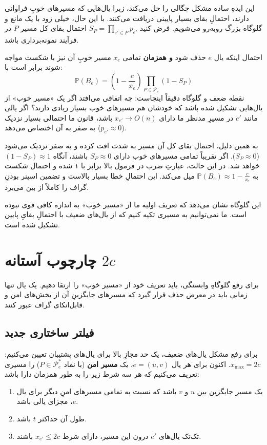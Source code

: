 \documentclass[11pt,a4paper]{report}
\theoremstyle{plain}
\theoremstyle{definition}
\theoremstyle{remark}
\begin{document}
این ایدهِ ساده مشکل چگالی را حل می‌کند، زیرا یال‌هایی که مسیرهای خوبِ فراوانی دارند، احتمالِ بقای بسیار پایینی دریافت می‌کنند. با این حال، خیلی زود با یک مانع و گلوگاه بزرگ روبه‌رو می‌شویم. فرض کنید $S_P = \prod_{e' \in P} p_{e'}$ احتمال بقای کل مسیر $P$ در فرآیند نمونه‌برداری باشد.

احتمال اینکه یال $e$ حذف شود \textbf{و همزمان} تمامی $x_e$ مسیر خوبِ آن نیز با شکست مواجه شوند برابر است با:
\[
\mathbb{P}(B_e) = \left( 1 - \frac{c}{x_e} \right) \prod_{P \in \mathcal{P}_e} (1 - S_P)
\]
نقطه ضعف و گلوگاه دقیقاً اینجاست: چه اتفاقی می‌افتد اگر یک «مسیر خوب» از یال‌هایی تشکیل شده باشد که خودشان هم مسیرهای خوب بسیار زیادی دارند؟ اگر یالی مانند $e'$ در مسیرِ مدنظر ما دارای $x_{e'} \to O(n)$ باشد، قانون ما احتمالی بسیار نزدیک به صفر به آن اختصاص می‌دهد ($p_{e'} \approx 0$).

به همین دلیل، احتمال بقای کل آن مسیر به شدت افت کرده و به صفر نزدیک می‌شود ($S_P \approx 0$). اگر تقریباً تمامی مسیرهای خوب دارای $S_P \approx 0$ باشند، آنگاه $(1 - S_P) \approx 1$ خواهد شد. در این حالت، عبارتِ ضرب در فرمول بالا برابر با ۱ شده و احتمال شکست به $\mathbb{P}(B_e) \approx 1 - \frac{c}{x_e}$ میل می‌کند. این احتمالِ خطا بسیار بالاست و تضمین اسپنر بودنِ گراف را کاملاً از بین می‌برد.

این گلوگاه نشان می‌دهد که تعریف اولیه ما از «مسیر خوب» به اندازه کافی قوی نبوده است. ما نمی‌توانیم به مسیری تکیه کنیم که از یال‌های ضعیف با احتمالِ بقایِ پایین تشکیل شده است.

\chapter{چارچوب آستانه \texorpdfstring{$2c$}{2c}}
برای رفع گلوگاهِ وابستگی، باید تعریف خود از «مسیر خوب» را ارتقا دهیم. یک یال تنها زمانی باید در معرض حذف قرار گیرد که مسیرهای جایگزینِ آن از بخش‌های امن و قابل‌اتکای گراف عبور کنند.

\section{فیلتر ساختاری جدید}
برای رفع مشکل یال‌های ضعیف، یک حد مجازِ بالا برای یال‌های پشتیبان تعیین می‌کنیم: $x_{\max} = 2c$. اکنون برای هر یال $e=(u,v)$، یک \textbf{مسیر امن} (با نماد $P \in \mathcal{P}^*_e$) را مسیری تعریف می‌کنیم که هر سه شرط زیر را به طور همزمان دارا باشد:
\begin{enumerate}
    \item یک مسیر جایگزین بین $u$ و $v$ باشد که نسبت به تمامی مسیرهای امنِ دیگر برای یال $e$، مجزای یالی باشد.
    \item طول آن حداکثر $t$ باشد.
    \item تک‌تک یال‌های $e'$ درون این مسیر، دارای شرط $x_{e'} \le 2c$ باشند.
\end{enumerate}
\end{document}
